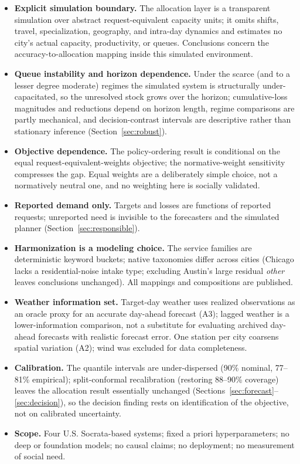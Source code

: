 \begin{itemize}
\item \textbf{Explicit simulation boundary.} The allocation layer is a
transparent simulation over abstract request-equivalent capacity units;
it omits shifts, travel, specialization, geography, and intra-day
dynamics and estimates no city's actual capacity, productivity, or
queues. Conclusions concern the accuracy-to-allocation mapping inside
this simulated environment.
\item \textbf{Queue instability and horizon dependence.} Under the scarce
(and to a lesser degree moderate) regimes the simulated system is
structurally under-capacitated, so the unresolved stock grows over the
horizon; cumulative-loss magnitudes and reductions depend on horizon
length, regime comparisons are partly mechanical, and decision-contrast
intervals are descriptive rather than stationary inference
(Section~\ref{sec:robust}).
\item \textbf{Objective dependence.} The policy-ordering result is
conditional on the equal request-equivalent-weights objective; the
normative-weight sensitivity compresses the gap. Equal weights are a
deliberately simple choice, not a normatively neutral one, and no
weighting here is socially validated.
\item \textbf{Reported demand only.} Targets and losses are functions of
reported requests; unreported need is invisible to the forecasters and
the simulated planner (Section~\ref{sec:responsible}).
\item \textbf{Harmonization is a modeling choice.} The service families
are deterministic keyword buckets; native taxonomies differ across cities
(Chicago lacks a residential-noise intake type; excluding Austin's large
residual \emph{other} leaves conclusions unchanged). All mappings and
compositions are published.
\item \textbf{Weather information set.} Target-day weather uses realized
observations as an oracle proxy for an accurate day-ahead forecast (A3);
lagged weather is a lower-information comparison, not a substitute for
evaluating archived day-ahead forecasts with realistic forecast error.
One station per city coarsens spatial variation (A2); wind was excluded
for data completeness.
\item \textbf{Calibration.} The quantile intervals are under-dispersed
(90\% nominal, 77--81\% empirical); split-conformal recalibration
(restoring 88--90\% coverage) leaves the allocation result essentially
unchanged (Sections~\ref{sec:forecast}--\ref{sec:decision}), so the
decision finding rests on identification of the objective, not on
calibrated uncertainty.
\item \textbf{Scope.} Four U.S. Socrata-based systems; fixed a priori
hyperparameters; no deep or foundation models; no causal claims; no
deployment; no measurement of social need.
\end{itemize}
